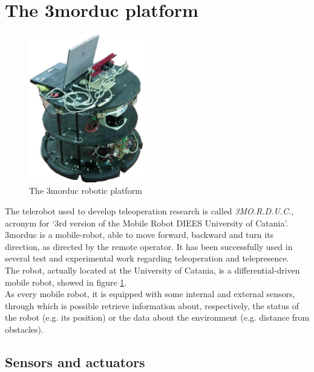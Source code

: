 \section{The 3morduc platform}
\label{intro:3morduc}

\begin{figure} [h]
  \begin{center}
    \includegraphics[width=150pt]{img/3morduc.jpg}
    \caption{The 3morduc robotic platform}
    \label{fig:morduc}
  \end{center}
\end{figure}

The telerobot used to develop teleoperation research is
called \textit{3MO.R.D.U.C.}, acronym for `3rd version of
the Mobile Robot DIEES University of Catania'.
3morduc is a mobile-robot, able to move forward, backward
and turn its direction, as directed by the remote operator.
It has been successfully used in several test and experimental
work regarding teleoperation and telepresence.
\\
The robot, actually located at the University of
Catania, is a differential-driven mobile robot, showed
in figure \ref{fig:morduc}.
\\
As every mobile robot, it is equipped with some internal
and external sensors, through which is possible retrieve
information about, respectively, the status of the robot
(e.g. its position) or the data about the environment (e.g.
distance from obstacles).

\subsection{Sensors and actuators}
\label{intro:3morduc:sensors_actuators}


